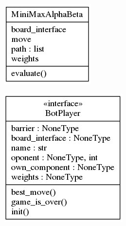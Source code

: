 \begin{minipage}[]{1.0\textwidth}

    \centering
    \begin{minipage}[t]{0.2\textwidth}
        \includegraphics[width=\textwidth]{images/classes_algorithms.png}
    \end{minipage}
    \begin{minipage}[t]{0.22\textwidth}
        \includegraphics[width=\textwidth]{images/classes_player.png}

\end{minipage}
\end{minipage}
